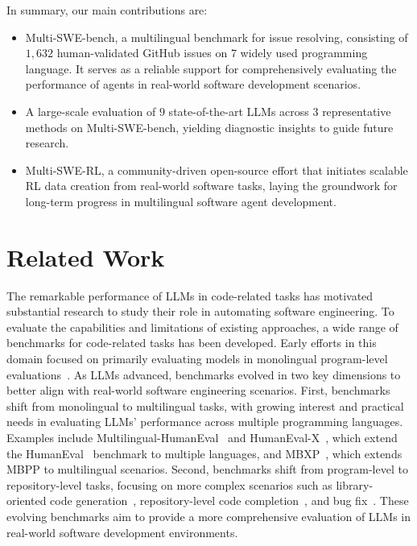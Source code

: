 \documentclass[11pt, a4paper, logo, copyright, nonumbering]{seed}
\newcommand{\multiswebench}{Multi-SWE-bench\xspace}
\newcommand{\multiswerl}{Multi-SWE-RL\xspace}
\begin{document}
In summary, our main contributions are:
\begin{itemize}
    \item \multiswebench, a multilingual benchmark for issue resolving, consisting of $1,632$ human-validated GitHub issues on $7$ widely used programming language. It serves as a reliable support for comprehensively evaluating the performance of agents in real-world software development scenarios.
    \item A large-scale evaluation of $9$ state-of-the-art LLMs across $3$ representative methods on \multiswebench, yielding diagnostic insights to guide future research.
    \item \multiswerl, a community-driven open-source effort that initiates scalable RL data creation from real-world software tasks, laying the groundwork for long-term progress in multilingual software agent development.
\end{itemize}

\section{Related Work}
The remarkable performance of LLMs in code-related tasks has motivated substantial research to study their role in automating software engineering.
To evaluate the capabilities and limitations of existing approaches, a wide range of benchmarks for code-related tasks has been developed.
Early efforts in this domain focused on primarily evaluating models in monolingual program-level evaluations~\citep{allamanis2013mining, raychev2016probabilistic, iyer2018mapping,chen2021evaluating, austin2021program, wang2023execution}.
As LLMs advanced, benchmarks evolved in two key dimensions to better align with real-world software engineering scenarios. 
First, benchmarks shift from monolingual to multilingual tasks, with growing interest and practical needs in evaluating LLMs' performance across multiple programming languages. 
Examples include Multilingual-HumanEval~\citep{athiwaratkun2023multi} and HumanEval-X~\citep{zheng2023codegeex}, which extend the HumanEval~\citep{codex} benchmark to multiple languages, and MBXP~\citep{athiwaratkunmulti}, which extends MBPP to multilingual scenarios. 
Second, benchmarks shift from program-level to repository-level tasks, focusing on more complex scenarios such as library-oriented code generation~\citep{zan2022cert}, repository-level code completion~\citep{zhang2023repocoder,liurepobench,ding2024crosscodeeval,graphcoder,yu2024codereval}, and bug fix~\citep{mundler2024swt, ouyang2024benchmarking, sunrepofixeval,saavedra2024gitbug}. 
These evolving benchmarks aim to provide a more comprehensive evaluation of LLMs in real-world software development environments.
\end{document}
